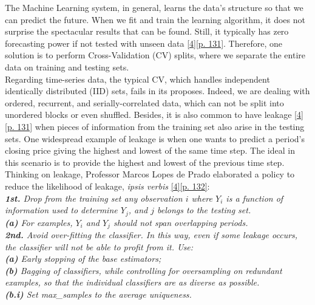 \quad The Machine Learning system, in general, learns the data's structure so that we can predict the future. When we fit and train the learning algorithm, it does not surprise the spectacular results that can be found. Still, it typically has zero forecasting power if not tested with unseen data \hyperref[Bib:Lopez de Prado]{[4][p. 131]}. Therefore, one solution is to perform Cross-Validation (CV) splits, where we separate the entire data on training and testing sets.\\

Regarding time-series data, the typical CV, which handles independent identically distributed (IID) sets, fails in its proposes. Indeed, we are dealing with ordered, recurrent, and serially-correlated data, which can not be split into unordered blocks or even shuffled. Besides, it is also common to have leakage \hyperref[Bib:Lopez de Prado]{[4][p. 131]} when pieces of information from the training set also arise in the testing sets. One widespread example of leakage is when one wants to predict a period's closing price giving the highest and lowest of the same time step. The ideal in this scenario is to provide the highest and lowest of the previous time step. Thinking on leakage, Professor Marcos Lopes de Prado elaborated a policy to reduce the likelihood of leakage, \textit{ipsis verbis} \hyperref[Bib:Lopez de Prado]{[4][p. 132]}:\\

\noindent \textit{\textbf{1st.} Drop from the training set any observation $i$ where $Y_i$ is a function of information used to determine $Y_j$, and $j$ belongs to the testing set.}\\

\qquad \textit{\textbf{(a)} For examples, $Y_i$ and $Y_j$ should not span overlapping periods.}\\

\noindent \textit{\textbf{2nd.} Avoid over-fitting the classifier. In this way, even if some leakage occurs, the classifier will not be able to profit from it. Use:}\\

\qquad \textit{\textbf{(a)} Early stopping of the base estimators;}\\

\qquad \textit{\textbf{(b)} Bagging of classifiers, while controlling for oversampling on redundant examples, so that the individual classifiers are as diverse as possible.}\\

\qquad \qquad \textit{\textbf{(b.i)} Set max\_samples to the average uniqueness.}\\

